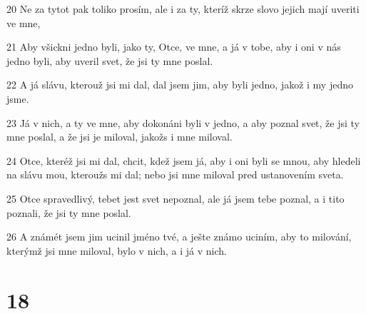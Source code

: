 \par 20 Ne za tytot pak toliko prosím, ale i za ty, kteríž skrze slovo jejich mají uveriti ve mne,
\par 21 Aby všickni jedno byli, jako ty, Otce, ve mne, a já v tobe, aby i oni v nás jedno byli, aby uveril svet, že jsi ty mne poslal.
\par 22 A já slávu, kterouž jsi mi dal, dal jsem jim, aby byli jedno, jakož i my jedno jsme.
\par 23 Já v nich, a ty ve mne, aby dokonáni byli v jedno, a aby poznal svet, že jsi ty mne poslal, a že jsi je miloval, jakožs i mne miloval.
\par 24 Otce, kteréž jsi mi dal, chcit, kdež jsem já, aby i oni byli se mnou, aby hledeli na slávu mou, kteroužs mi dal; nebo jsi mne miloval pred ustanovením sveta.
\par 25 Otce spravedlivý, tebet jest svet nepoznal, ale já jsem tebe poznal, a i tito poznali, že jsi ty mne poslal.
\par 26 A známét jsem jim ucinil jméno tvé, a ješte známo uciním, aby to milování, kterýmž jsi mne miloval, bylo v nich, a i já v nich.

\chapter{18}


